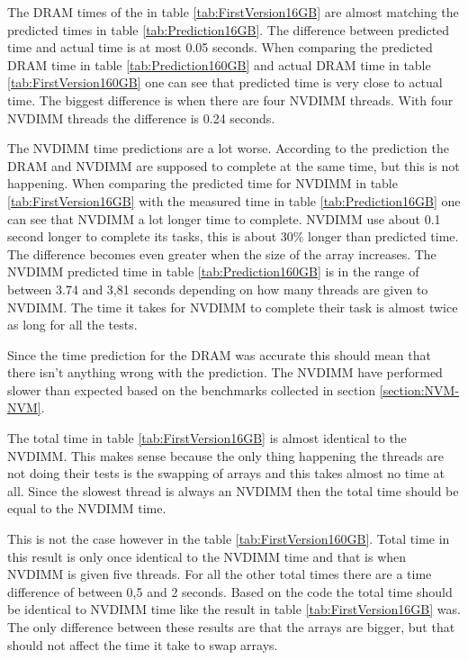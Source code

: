 \documentclass[12pt,a4paper,USenglish]{article}      %
\begin{document}
The DRAM times of the in table \ref{tab:FirstVersion16GB} are almost matching the predicted times in table \ref{tab:Prediction16GB}. The difference between predicted time and actual time is at most 0.05 seconds.
When comparing the predicted DRAM time in table \ref{tab:Prediction160GB} and actual DRAM time in table \ref{tab:FirstVersion160GB} one can see that predicted time is very close to actual time. The biggest difference is when there are four NVDIMM threads. With four NVDIMM threads the difference is 0.24 seconds.

The NVDIMM time predictions are a lot worse. According to the prediction the DRAM and NVDIMM are supposed to complete at the same time, but this is not happening. When comparing the predicted time for NVDIMM in table \ref{tab:FirstVersion16GB} with the measured time in table \ref{tab:Prediction16GB} one can see that NVDIMM a lot longer time to complete. NVDIMM use about 0.1 second longer to complete its tasks, this is about 30\% longer than predicted time.
The difference becomes even greater when the size of the array increases. The NVDIMM predicted time in table \ref{tab:Prediction160GB} is in the range of between 3.74 and 3,81 seconds depending on how many threads are given to NVDIMM. The time it takes for NVDIMM to complete their task is almost twice as long for all the tests.

Since the time prediction for the DRAM was accurate this should mean that there isn't anything wrong with the prediction. The NVDIMM have performed slower than expected based on the benchmarks collected in section \ref{section:NVM-NVM}.

The total time in table \ref{tab:FirstVersion16GB} is almost identical to the NVDIMM. This makes sense because the only thing happening the threads are not doing their tests is the swapping of arrays and this takes almost no time at all. Since the slowest thread is always an NVDIMM then the total time should be equal to the NVDIMM time.

This is not the case however in the table \ref{tab:FirstVersion160GB}. Total time in this result is only once identical to the NVDIMM time and that is when NVDIMM is given five threads. For all the other total times there are a time difference of between 0,5 and 2 seconds. 
Based on the code the total time should be identical to NVDIMM time like the result in table \ref{tab:FirstVersion16GB} was. The only difference between these results are that the arrays are bigger, but that should not affect the time it take to swap arrays. 
\end{document}
